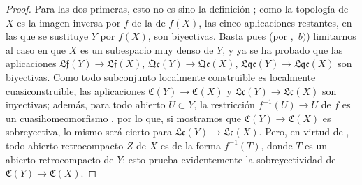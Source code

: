 \begin{proof}
Para las dos primeras, esto no es sino la definición ; como la topología de $X$ es la imagen inversa por $f$ de la de $f(X)$, las cinco aplicaciones restantes, en las que se sustituye $Y$ por $f(X)$, son biyectivas.
Basta pues (por ,~$b)$) limitarnos al caso en que $X$ es un subespacio muy denso de $Y$, y ya se ha probado  que las aplicaciones $\mathfrak{Lf}(Y)\to\mathfrak{Lf}(X)$, $\mathfrak{Qc}(Y)\to\mathfrak{Qc}(X)$, $\mathfrak{Lqc}(Y)\to\mathfrak{Lqc}(X)$ son biyectivas.
Como todo subconjunto localmente construible es localmente cuasiconstruible, las aplicaciones $\mathfrak{C}(Y)\to\mathfrak{C}(X)$ y $\mathfrak{Lc}(Y)\to\mathfrak{Lc}(X)$ son inyectivas; además, para todo abierto $U\subset Y$, la restricción $f^{-1}(U)\to U$ de $f$ es un cuasihomeomorfismo , por lo que, si mostramos que $\mathfrak{C}(Y)\to\mathfrak{C}(X)$ es sobreyectiva, lo mismo será cierto para $\mathfrak{Lc}(Y)\to\mathfrak{Lc}(X)$.
Pero, en virtud de , todo abierto retrocompacto $Z$ de $X$ es de la forma $f^{-1}(T)$, donde $T$ es un abierto retrocompacto de $Y$; esto prueba evidentemente la sobreyectividad de $\mathfrak{C}(Y)\to\mathfrak{C}(X)$.
\end{proof}

